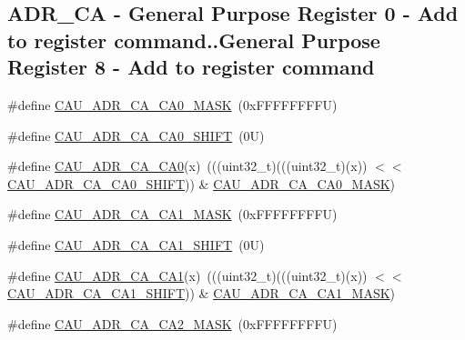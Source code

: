 \subsection*{A\+D\+R\+\_\+\+CA -\/ General Purpose Register 0 -\/ Add to register command..General Purpose Register 8 -\/ Add to register command}
\begin{DoxyCompactItemize}
\item 
\#define \mbox{\hyperlink{group___c_a_u___register___masks_ga414839bf216530416ea2338f5027fd46}{C\+A\+U\+\_\+\+A\+D\+R\+\_\+\+C\+A\+\_\+\+C\+A0\+\_\+\+M\+A\+SK}}~(0x\+F\+F\+F\+F\+F\+F\+F\+F\+U)
\item 
\#define \mbox{\hyperlink{group___c_a_u___register___masks_ga2e21fe07cc0b8acdef6e46075cc75770}{C\+A\+U\+\_\+\+A\+D\+R\+\_\+\+C\+A\+\_\+\+C\+A0\+\_\+\+S\+H\+I\+FT}}~(0\+U)
\item 
\#define \mbox{\hyperlink{group___c_a_u___register___masks_ga74e5e963432638577dc5004cf9ac7954}{C\+A\+U\+\_\+\+A\+D\+R\+\_\+\+C\+A\+\_\+\+C\+A0}}(x)~(((uint32\+\_\+t)(((uint32\+\_\+t)(x)) $<$$<$ \mbox{\hyperlink{group___c_a_u___register___masks_ga2e21fe07cc0b8acdef6e46075cc75770}{C\+A\+U\+\_\+\+A\+D\+R\+\_\+\+C\+A\+\_\+\+C\+A0\+\_\+\+S\+H\+I\+FT}})) \& \mbox{\hyperlink{group___c_a_u___register___masks_ga414839bf216530416ea2338f5027fd46}{C\+A\+U\+\_\+\+A\+D\+R\+\_\+\+C\+A\+\_\+\+C\+A0\+\_\+\+M\+A\+SK}})
\item 
\#define \mbox{\hyperlink{group___c_a_u___register___masks_gaa06ea4a2e4659354d7720c10f40f491c}{C\+A\+U\+\_\+\+A\+D\+R\+\_\+\+C\+A\+\_\+\+C\+A1\+\_\+\+M\+A\+SK}}~(0x\+F\+F\+F\+F\+F\+F\+F\+F\+U)
\item 
\#define \mbox{\hyperlink{group___c_a_u___register___masks_ga0627f84884a77f1e20570b01eacc50e8}{C\+A\+U\+\_\+\+A\+D\+R\+\_\+\+C\+A\+\_\+\+C\+A1\+\_\+\+S\+H\+I\+FT}}~(0\+U)
\item 
\#define \mbox{\hyperlink{group___c_a_u___register___masks_ga2383410eeb89d47fdb25e5e0d0d6049f}{C\+A\+U\+\_\+\+A\+D\+R\+\_\+\+C\+A\+\_\+\+C\+A1}}(x)~(((uint32\+\_\+t)(((uint32\+\_\+t)(x)) $<$$<$ \mbox{\hyperlink{group___c_a_u___register___masks_ga0627f84884a77f1e20570b01eacc50e8}{C\+A\+U\+\_\+\+A\+D\+R\+\_\+\+C\+A\+\_\+\+C\+A1\+\_\+\+S\+H\+I\+FT}})) \& \mbox{\hyperlink{group___c_a_u___register___masks_gaa06ea4a2e4659354d7720c10f40f491c}{C\+A\+U\+\_\+\+A\+D\+R\+\_\+\+C\+A\+\_\+\+C\+A1\+\_\+\+M\+A\+SK}})
\item 
\#define \mbox{\hyperlink{group___c_a_u___register___masks_ga9294c3d57841472174044b71a5a271ad}{C\+A\+U\+\_\+\+A\+D\+R\+\_\+\+C\+A\+\_\+\+C\+A2\+\_\+\+M\+A\+SK}}~(0x\+F\+F\+F\+F\+F\+F\+F\+F\+U)

\end{DoxyCompactItemize}
